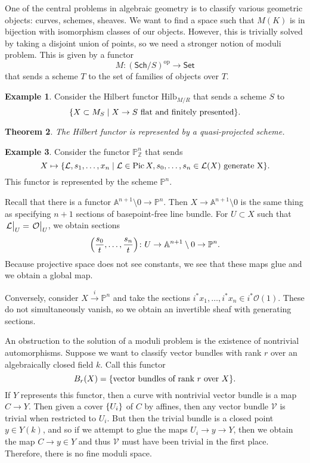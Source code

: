 \documentclass[leqno, openany]{memoir}
\newtheorem{thm}{Theorem}[section]
\theoremstyle{definition}
\newtheorem{exm}[thm]{Example}
\theoremstyle{remark}
\theoremstyle{plain}
\theoremstyle{definition}
\theoremstyle{remark}
\newcommand{\A}{\mathbb{A}}
\newcommand{\Z}{\mathbb{Z}}
\renewcommand{\P}{\mathbb{P}}
\newcommand{\mc}[1]{\mathcal{#1}}
\newcommand{\mr}[1]{\mathrm{#1}}
\newcommand{\ms}[1]{\mathsf{#1}}
\DeclareMathOperator{\Pic}{Pic}
\begin{document}
One of the central problems in algebraic geometry is to classify various
geometric objects: curves, schemes, sheaves. We want to find a space such that
$M(K)$ is in bijection with isomorphism classes of our objects. However, this
is trivially solved by taking a disjoint union of points, so we need a stronger
notion of moduli problem. This is given by a functor \[ M \colon
(\ms{Sch}/S)^{\mr{op}} \to \ms{Set} \] that sends a scheme $T$ to the set of
families of objects over $T$.

\begin{exm} Consider the Hilbert functor $\mr{Hilb}_{M/R}$ that sends a scheme
    $S$ to \[ \qty{X \subset M_S \mid X \to S \text{ flat and finitely
    presented}}. \] \end{exm}

\begin{thm} The Hilbert functor is represented by a quasi-projected scheme.
\end{thm}

\begin{exm} Consider the functor $\P^n_{\Z}$ that sends \[ X \mapsto
\qty{\mc{L}, s_1, \ldots, x_n \mid \mc{L} \in \Pic X, s_0, \ldots, s_n \in
\mc{L}(X) \text{ generate X} }. \] This functor is represented by the scheme
$\P^n$.

    Recall that there is a functor $\A^{n+1} \setminus 0 \to \P^n$. Then $X \to
    \A^{n+1} \setminus 0$ is the same thing as specifying $n+1$ sections of
    basepoint-free line bundle. For $U \subset X$ such that $\eval{\mc{L}}_U =
    \eval{\mc{O}}_U$, we obtain sections \[ \qty( \frac{s_0}{t}, \ldots,
    \frac{s_n}{t} ) \colon U \to \A^{n+1} \setminus 0 \to \P^n. \] Because
    projective space does not see constants, we see that these maps glue and we
    obtain a global map.

    Conversely, consider $X \xrightarrow{i} \P^n$ and take the sections
$i^*x_1, \ldots, i^* x_n \in i^* \mc{O}(1)$. These do not simultaneously
vanish, so we obtain an invertible sheaf with generating sections.  \end{exm}

An obstruction to the solution of a moduli problem is the existence of
nontrivial automorphisms. Suppose we want to classify vector bundles with rank
$r$ over an algebraically closed field $k$. Call this functor \[ B_r(X) =
\qty{\text{vector bundles of rank $r$ over $X$}}. \] If $Y$ represents this
functor, then a curve with nontrivial vector bundle is a map $C \to Y$. Then
given a cover $\qty{U_i}$ of $C$ by affines, then any vector bundle $\mc{V}$ is
trivial when restricted to $U_i$. But then the trivial bundle is a closed point
$y \in Y(k)$, and so if we attempt to glue the maps $U_i \to y \to Y$, then we
obtain the map $C \to y \in Y$ and thus $\mc{V}$ must have been trivial in the
first place. Therefore, there is no fine moduli space.
\end{document}
